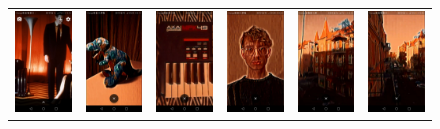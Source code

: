 \documentclass[../Main.tex]{subfiles}
\begin{document}
\begin{figure}[H]
\begin{tabular}{cccccc}
\includegraphics[width = 0.13\linewidth]{Images/app_photos/filters/twin.jpg} &
\includegraphics[width = 0.13\linewidth]{Images/app_photos/dino/twin.jpg} &
\includegraphics[width = 0.13\linewidth]{Images/app_photos/akai/twin.jpg} &
\includegraphics[width = 0.13\linewidth]{Images/app_photos/me/twin.jpg} &
\includegraphics[width = 0.13\linewidth]{Images/app_photos/kamienica/twin.jpg} &
\includegraphics[width = 0.13\linewidth]{Images/app_photos/ulica/twin.jpg} \\


\end{tabular}
\end{figure}
\end{document}
